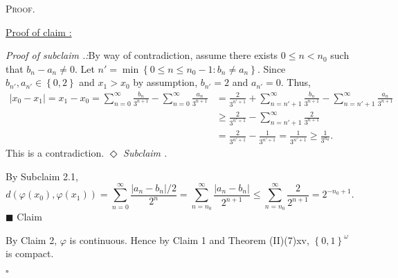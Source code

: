 \documentclass[12pt]{article}
\newcounter{ProofCounter}
\newcounter{ClaimCounter}[ProofCounter]
\newcounter{SubClaimCounter}[ClaimCounter]
\newenvironment{Proof}{\stepcounter{ProofCounter}\textsc{Proof.}}{\hfill$\square$}
\newenvironment{claimproof}[1]{\par\noindent\underline{Proof of claim \theClaimCounter:}\space#1}{\hfill $\blacksquare$ Claim \theClaimCounter}
\newenvironment{subclaim}[1]{\stepcounter{SubClaimCounter}\par\noindent\emph{Subclaim \theClaimCounter.\theSubClaimCounter:}\space#1}{}
\newenvironment{subclaimproof}[1]{\par\noindent\emph{Proof of subclaim \theClaimCounter.\theSubClaimCounter:}\space#1}{\hfill
$\Diamond$ \emph{Subclaim \theClaimCounter.\theSubClaimCounter}}
\begin{document}
\begin{Proof}
\begin{claimproof}
    \begin{subclaimproof}
      By way of contradiction, assume there exists $0 \leq n< n_{0}$ such that $b_{n} - a_{n} \neq 0$. Let $n' = \min\left\{ 0 \leq n \leq n_0 -1 :
      b_{n} \neq a_{n} \right\}$. Since $b_{n'}, a_{n'} \in \left\{ 0,2 \right\}$ and $x_{1} > x_{0}$ by assumption, $b_{n'} = 2$ and $a_{n'} = 0$. Thus,
      \begin{align*}
        |x_{0} - x_{1}| = x_{1} - x_{0} = \sum_{n=0}^{\infty}\frac{b_{n}}{3^{n+1}} - \sum_{n=0}^{\infty}\frac{a_{n}}{3^{n+1}} 
        & = \frac{2}{3^{n'+1}} + \sum_{n=n'+1}^{\infty}\frac{b_{n}}{3^{n+1}} - \sum_{n=n'+1}^{\infty}\frac{a_{n}}{3^{n+1}} \\
        & \geq \frac{2}{3^{n'+1}} - \sum_{n=n'+1}^{\infty}\frac{2}{3^{n+1}} \\
        & = \frac{2}{3^{n'+1}} - \frac{1}{3^{n'+1}} = \frac{1}{3^{n'+1}} \geq \frac{1}{3^{n_{0}}}.
      \end{align*}
      This is a contradiction.
    \end{subclaimproof}

    By Subclaim 2.1,
    \[ d(\varphi(x_0), \varphi(x_1)) = \sum_{n=0}^{\infty}\frac{|a_n - b_n|/2}{2^{n}} = \sum_{n=n_0}^{\infty}\frac{|a_n - b_n|}{2^{n+1}} \leq
    \sum_{n=n_0}^{\infty}\frac{2}{2^{n+1}} = 2^{-n_0+1}. \]
  \end{claimproof}

  By Claim 2, $\varphi$ is continuous. Hence by Claim 1 and Theorem (II)(7)xv, $\left\{ 0,1 \right\}^{\omega}$ is compact.

\end{Proof}
\end{document}
